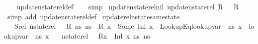 \begin{isabellebody}
%
\isadelimproof
\ \ %
\endisadelimproof
%
\isatagproof
{}\isamarkupfalse%
\ update{\isacharunderscore}{\kern0pt}nstate{\isacharunderscore}{\kern0pt}rel{\isacharunderscore}{\kern0pt}def\isanewline
\ \ \isamarkupfalse%
\ simp%
\endisatagproof
{\isafoldproof}%
%
\isadelimproof
\isanewline
%
\endisadelimproof
\isanewline
{}\isamarkupfalse%
\ update{\isacharunderscore}{\kern0pt}nstate{\isacharunderscore}{\kern0pt}rel{\isacharunderscore}{\kern0pt}nil{\isacharcolon}{\kern0pt}\ {\isachardoublequoteopen}update{\isacharunderscore}{\kern0pt}nstate{\isacharunderscore}{\kern0pt}rel\ R\ {\isacharbrackleft}{\kern0pt}{\isacharbrackright}{\kern0pt}\ {\isacharequal}{\kern0pt}\ R{\isachardoublequoteclose}\ \isanewline
%
\isadelimproof
\ \ %
\endisadelimproof
%
\isatagproof
{}\isamarkupfalse%
\ {\isacharparenleft}{\kern0pt}simp\ add{\isacharcolon}{\kern0pt}\ update{\isacharunderscore}{\kern0pt}nstate{\isacharunderscore}{\kern0pt}rel{\isacharunderscore}{\kern0pt}def{\isacharparenright}{\kern0pt}%
\endisatagproof
{\isafoldproof}%
%
\isadelimproof
\isanewline
%
\endisadelimproof
\isanewline
{}\isamarkupfalse%
\ update{\isacharunderscore}{\kern0pt}rel{\isacharunderscore}{\kern0pt}nstate{\isacharunderscore}{\kern0pt}same{\isacharunderscore}{\kern0pt}state{\isacharcolon}{\kern0pt}\isanewline
\ \ \ Srel{\isacharcolon}{\kern0pt}\ {\isachardoublequoteopen}nstate{\isacharunderscore}{\kern0pt}rel\ {\isasymLambda}\ {\isasymLambda}{\isacharprime}{\kern0pt}\ R\ ns{}\ ns{}{\isachardoublequoteclose}\ \ {\isachardoublequoteopen}R\ x\ {\isacharequal}{\kern0pt}\ Some\ {\isacharparenleft}{\kern0pt}Inl\ x{}{\isacharparenright}{\kern0pt}{\isachardoublequoteclose}\ \ LookupEq{\isacharcolon}{\kern0pt}{\isachardoublequoteopen}lookup{\isacharunderscore}{\kern0pt}var\ {\isasymLambda}{\isacharprime}{\kern0pt}\ ns{}\ x{}\ {\isacharequal}{\kern0pt}\ lookup{\isacharunderscore}{\kern0pt}var\ {\isasymLambda}{\isacharprime}{\kern0pt}\ ns{}\ x{}{\isachardoublequoteclose}\isanewline
\ \ \ {\isachardoublequoteopen}nstate{\isacharunderscore}{\kern0pt}rel\ {\isasymLambda}\ {\isasymLambda}{\isacharprime}{\kern0pt}\ {\isacharparenleft}{\kern0pt}R{\isacharparenleft}{\kern0pt}x\ {\isasymmapsto}\ {\isacharparenleft}{\kern0pt}Inl\ x{}{\isacharparenright}{\kern0pt}{\isacharparenright}{\kern0pt}{\isacharparenright}{\kern0pt}\ ns{}\ ns{}{\isachardoublequoteclose}\isanewline

\end{isabellebody}
